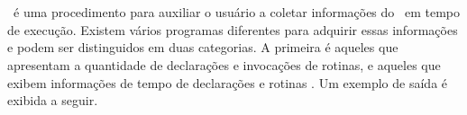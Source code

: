\section{\Profile} \label{sec:profile}

		\Profile\ é uma procedimento para auxiliar o usuário a coletar informações do \software\ em tempo de execução.
      Existem vários programas diferentes para adquirir essas informações e podem ser distinguidos em duas categorias.
      A primeira é aqueles que apresentam a quantidade de declarações e invocações de rotinas, e aqueles que exibem informações de tempo de declarações e rotinas \citep{nemeth2004manual}. Um exemplo de saída é exibida a seguir.

